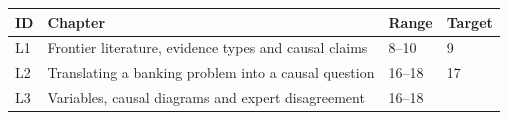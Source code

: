\documentclass[
  11pt,
  a4paper,
]{article}
\begin{document}
\begin{longtable}[]{@{}llll@{}}
\toprule
\begin{minipage}[b]{0.22\columnwidth}\raggedright
ID\strut
\end{minipage} & \begin{minipage}[b]{0.22\columnwidth}\raggedright
Chapter\strut
\end{minipage} & \begin{minipage}[b]{0.22\columnwidth}\raggedright
Range\strut
\end{minipage} & \begin{minipage}[b]{0.22\columnwidth}\raggedright
Target\strut
\end{minipage}\tabularnewline
\midrule
\endhead
\begin{minipage}[t]{0.22\columnwidth}\raggedright
L1\strut
\end{minipage} & \begin{minipage}[t]{0.22\columnwidth}\raggedright
Frontier literature, evidence types and causal claims\strut
\end{minipage} & \begin{minipage}[t]{0.22\columnwidth}\raggedright
8--10\strut
\end{minipage} & \begin{minipage}[t]{0.22\columnwidth}\raggedright
9\strut
\end{minipage}\tabularnewline
\begin{minipage}[t]{0.22\columnwidth}\raggedright
L2\strut
\end{minipage} & \begin{minipage}[t]{0.22\columnwidth}\raggedright
Translating a banking problem into a causal question\strut
\end{minipage} & \begin{minipage}[t]{0.22\columnwidth}\raggedright
16--18\strut
\end{minipage} & \begin{minipage}[t]{0.22\columnwidth}\raggedright
17\strut
\end{minipage}\tabularnewline
\begin{minipage}[t]{0.22\columnwidth}\raggedright
L3\strut
\end{minipage} & \begin{minipage}[t]{0.22\columnwidth}\raggedright
Variables, causal diagrams and expert disagreement\strut
\end{minipage} & \begin{minipage}[t]{0.22\columnwidth}\raggedright
16--18\strut
\end{minipage} & \begin{minipage}[t]{0.22\columnwidth}\raggedright

\end{minipage}
\end{longtable}
\end{document}
